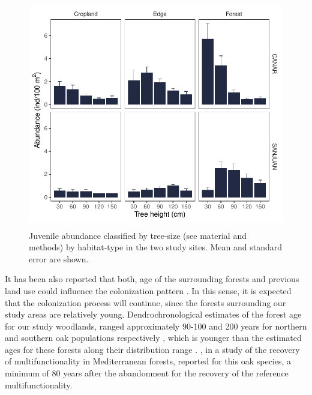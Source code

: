 \begin{figure}
    \centering
    \includegraphics[width=\textwidth,height=10cm,
  keepaspectratio]{img/coloniza/coloniza-TreeCategory.pdf}
    \caption{Juvenile abundance classified by tree-size (see material and methods) by habitat-type in the two study sites. Mean and standard error are shown.}
    \label{fig:coloniza:treeCategory}
\end{figure}

It has been also reported that both, age of the surrounding forests and previous land use could influence the colonization pattern \autocite{MinottaDegioanni2011NaturallyRegenerated}. In this sense, it is expected that the colonization process will continue, since the forests surrounding our study areas are relatively young. Dendrochronological estimates of the forest age for our study woodlands, ranged approximately 90-100 and 200 years for northern and southern oak populations respectively \autocite{PerezLuqueetal2020LanduseLegacies, GeaIzquierdoCanellas2014LocalClimate}, which is younger than the estimated ages for these forests along their distribution range \autocites{GeaIzquierdoCanellas2014LocalClimate}. \citet{CruzAlonsoetal2019LongTerm}, in a study of the recovery of multifunctionality in Mediterranean forests, reported for this oak species, a minimum of 80 years after the abandonment for the recovery of the reference multifunctionality. 

